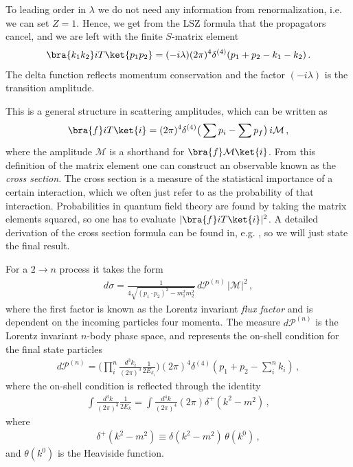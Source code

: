 To leading order in $\lambda$ we do not need any information from renormalization, i.e. we can set $Z=1$. Hence, we get from the LSZ formula that the propagators cancel, and we are left with the finite $S$-matrix element
\begin{align}\label{eq:amplitude from LSZ}
    \bra{k_1 k_2}iT\ket{p_1 p_2}=(-i\lambda)(2\pi)^{4}\delta^{(4)}(p_1+p_2-k_1-k_2)\,.
\end{align}
The delta function reflects momentum conservation and the factor $(-i\lambda)$ is the transition amplitude. 

This is a general structure in scattering amplitudes, which can be written as
\begin{align}\label{eq:iT scattering amplitude}
    \bra{f}iT\ket{i}=(2\pi)^{4}\delta^{(4)}\big(\sum p_i-\sum p_f\big)\,i\mathcal{M}\,,
\end{align}
where the amplitude $\mathcal{M}$ is a shorthand for $\bra{f}\mathcal{M}\ket{i}$. From this definition of the matrix element one can construct an observable known as the \emph{cross section}. The cross section is a measure of the statistical importance of a certain interaction, which we often just refer to as the probability of that interaction. Probabilities in quantum field theory are found by taking the matrix elements squared, so one has to evaluate $|\bra{f}iT\ket{i}|^{2}$. A detailed derivation of the cross section formula can be found in, e.g. \cite{Peskin:257493,Schwartz:2013pla,Maggiore:2005qv}, so we will just state the final result. 

For a $2\rightarrow n$ process it takes the form
\begin{align}
    d\sigma=\frac{1}{4\sqrt{(p_1\cdot p_2)^{2}-m_{1}^{2}m_{2}^{2}}}\,d\mathcal{P}^{(n)}\,|\mathcal{M}|^{2}\,,
\end{align}
where the first factor is known as the Lorentz invariant \emph{flux factor} and is dependent on the incoming particles four momenta. The measure $d\mathcal{P}^{(n)}$ is the Lorentz invariant $n$-body phase space, and represents the on-shell condition for the final state particles
\begin{align}\label{eq:n-body phase space}
    d\mathcal{P}^{(n)}=\Big(\prod_{i}^{n}\frac{d^{3}k_{i}}{(2\pi)^{3}}\frac{1}{2E_{k_i}}\Big)(2\pi)^{4}\delta^{(4)}(p_1+p_2-\sum_{i}^{n}k_i)\,,
\end{align}
where the on-shell condition is reflected through the identity
\begin{align}
    \int\frac{d^{3}k}{(2\pi)^{3}}\frac{1}{2E_{k}}=\int\frac{d^{4}k}{(2\pi)^{4}}(2\pi)\delta^{+}(k^{2}-m^{2})\,,
\end{align}
where
\begin{align}
    \delta^{+}(k^{2}-m^{2})\equiv \delta(k^{2}-m^{2})\,\theta(k^{0})\,,
\end{align}
and $\theta(k^{0})$ is the Heaviside function.

